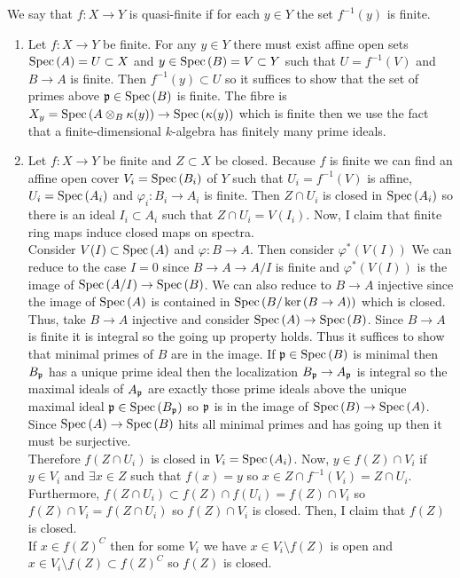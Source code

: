 \documentclass[12pt]{article}
\begin{document}
\begin{definition}
We say that $f : X \to Y$ is quasi-finite if for each $y \in Y$ the set $f^{-1}(y)$ is finite.
\end{definition}

\begin{enumerate}
\item Let $f : X \to Y$ be finite. For any $y \in Y$ there must exist affine open sets $\mathrm{Spec}\left( A \right) = U \subset X$ and $y \in \mathrm{Spec}\left( B \right) = V \subset Y$ such that $U = f^{-1}(V)$ and $B \to A$ is finite. Then $f^{-1}(y) \subset U$ so it suffices to show that the set of primes above $\mathfrak{p} \in \mathrm{Spec}\left( B \right)$ is finite. The fibre is $X_y = \mathrm{Spec}\left( A \otimes_B \kappa(y) \right) \to \mathrm{Spec}\left( \kappa(y) \right)$ which is finite then we use the fact that a finite-dimensional $k$-algebra has finitely many prime ideals. 
\item Let $f : X \to Y$ be finite and $Z \subset X$ be closed. Because $f$ is finite we can find an affine open cover $V_i = \mathrm{Spec}\left( B_i \right)$ of $Y$ such that $U_i = f^{-1}(V)$ is affine, $U_i = \mathrm{Spec}\left( A_i \right)$ and $\varphi_i : B_i \to A_i$ is finite. Then $Z \cap U_i$ is closed in $\mathrm{Spec}\left( A_i \right)$ so there is an ideal $I_i \subset A_i$ such that $Z \cap U_i = V(I_i)$. Now, I claim that finite ring maps induce closed maps on spectra. 
\bigskip\\
Consider $V(I) \subset \mathrm{Spec}\left( A \right)$ and $\varphi : B \to A$. Then consider $\varphi^*(V(I))$
We can reduce to the case $I = 0$ since $B \to A \to A / I$ is finite and $\varphi^*(V(I))$ is the image of $\mathrm{Spec}\left( A / I \right) \to \mathrm{Spec}\left( B \right)$. We can also reduce to $B \to A$ injective since the image of $\mathrm{Spec}\left( A \right)$ is contained in $\mathrm{Spec}\left( B / \ker{(B \to A)} \right)$ which is closed. Thus, take $B \to A$ injective and consider $\mathrm{Spec}\left( A \right) \to \mathrm{Spec}\left( B \right)$. Since $B \to A$ is finite it is integral so the going up property holds. Thus it suffices to show that minimal primes of $B$ are in the image. If $\mathfrak{p} \in \mathrm{Spec}\left( B \right)$ is minimal then $B_{\mathfrak{p}}$ has a unique prime ideal then the localization $B_{\mathfrak{p}} \to A_{\mathfrak{p}}$ is integral so the maximal ideals of $A_{\mathfrak{p}}$ are exactly those prime ideals above the unique maximal ideal $\mathfrak{p} \in \mathrm{Spec}\left( B_{\mathfrak{p}} \right)$ so $\mathfrak{p}$ is in the image of $\mathrm{Spec}\left( B \right) \to \mathrm{Spec}\left( A \right)$. Since $\mathrm{Spec}\left( A \right) \to \mathrm{Spec}\left( B \right)$ hits all minimal primes and has going up then it must be surjective. 
\bigskip\\
Therefore $f(Z \cap U_i)$ is closed in $V_i = \mathrm{Spec}\left( A_i \right)$. Now, $y \in f(Z) \cap V_i$ if $y \in V_i$ and $\exists x \in Z$ such that $f(x) = y$ so $x \in Z \cap f^{-1}(V_i) = Z \cap U_i$. Furthermore, $f(Z \cap U_i) \subset f(Z) \cap f(U_i) = f(Z) \cap V_i$ so $f(Z) \cap V_i = f(Z \cap U_i)$ so $f(Z) \cap V_i$ is closed. Then, I claim that $f(Z)$ is closed. 
\bigskip\\
If $x \in f(Z)^C$ then for some $V_i$ we have $x \in V_i \setminus f(Z)$ is open and $x \in V_i \setminus f(Z) \subset f(Z)^C$ so $f(Z)$ is closed. 


\end{enumerate}
\end{document}
